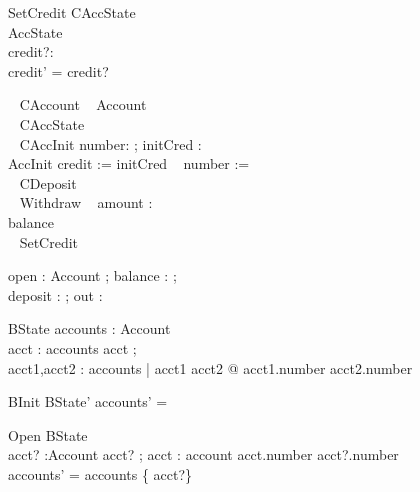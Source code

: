 \documentclass[a4paper,10pt]{article}
\begin{document}
 \begin{schema}{SetCredit}
 \Delta CAccState\\
 \Xi AccState\\
 credit?:\nat\\
 \where
 credit' = credit? 
 \end{schema}



\begin{circus}
  \ohcircclass ~ CAccount ~ \circdef \ohcircextends Account ~ \circbegin\\

  \ohcircstate ~ CAccState \\

  \ohcircinitial ~ CAccInit \circdef \circval number: \nat ; initCred : \nat \\
  \circspot AccInit \circseq credit := initCred ~ \circseq number := \ohcircnull\\

  \ohcircpublic ~ CDeposit\\
  
  \ohcircpublic ~ Withdraw ~ \circdef \circval amount : \nat \\
  \circspot  balance \prefixcolon [ amount \leq balance + credit , balance' = balance - amount ] \\
  
  \ohcircpublic ~ SetCredit\\

\circend
\end{circus}



\begin{circus}
\circchannel open : Account ; balance : \nat ;\\
             deposit : \nat \cross \nat ; out : \nat
\end{circus}


\begin{schema}{BState}
 accounts : \power Account\\
\where
\forall acct : accounts \spot acct \neq \ohcircnull ;\\
\forall acct1,acct2 : accounts | acct1 \neq acct2 @ acct1.number \neq acct2.number
\end{schema}


\begin{schema}{BInit}
 BState'
\where
accounts' = \emptyset 
\end{schema}


\begin{schema}{Open}
 \Delta BState \\
acct? :Account
\where
acct? \neq \ohcircnull ;
\forall acct : account \spot acct.number \neq acct?.number \\
accounts' = accounts \cup \{ acct?\}
\end{schema}
\end{document}
